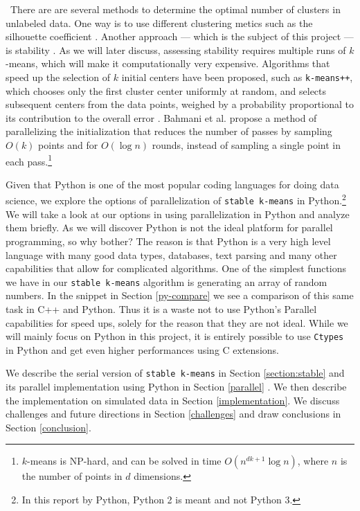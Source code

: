 \documentclass[10pt,twocolumn,letterpaper]{article}
\begin{document}
\
There are are several methods to determine the optimal number of clusters in unlabeled data. One way is to use different clustering metics such as the silhouette coefficient \cite{aranganayagi2007}. Another approach --- which is the subject of this project --- is stability \cite{ben2001}\cite{smith1980}. As we will later discuss, assessing stability requires multiple runs of $k$-means, which will make it computationally very expensive. Algorithms that speed up the selection of $k$ initial centers have been proposed, such as {\texttt{k-means++}}, which chooses only the first cluster center uniformly at random, and selects subsequent centers from the data points, weighed by a probability proportional to its contribution to the overall error \cite{arthur2007}. Bahmani et al. \cite{bahmani2012} propose a method of parallelizing the initialization that reduces the number of passes by sampling $O(k)$ points and for $O (\log n)$ rounds, instead of sampling a single point in each pass.\footnote{$k$-means is NP-hard, and can be solved in time  $O (n^{dk +1} \log n)$, where $n$ is the number of points in $d$ dimensions.}

Given that Python is one of the most popular coding languages for doing data science, we explore the options of parallelization of \texttt{stable k-means} in Python.\footnote{In this report by Python, Python 2 is meant and not Python 3.} We will take a look at our options in using parallelization in Python and analyze them briefly. As we will discover Python is not the ideal platform for parallel programming, so why bother? The reason is that Python is a very high level language with many good data types, databases, text parsing and many other capabilities that allow for complicated algorithms. One of the simplest functions we have in our \texttt{stable k-means} algorithm is generating an array of random numbers. In the snippet in Section \ref{py-compare} we see a comparison of this same task in C++ and Python. Thus it is a waste not to use Python's Parallel capabilities for speed ups, solely for the reason that they are not ideal. While we will mainly focus on Python in this project, it is entirely possible to use \texttt{Ctypes} in Python and get even higher performances using C extensions.

We describe the serial version of \texttt{stable k-means} in Section \ref{section:stable} and its parallel implementation using Python in Section \ref{parallel} . We then describe the implementation on simulated data in Section \ref{implementation}. We discuss challenges and future directions in Section \ref{challenges} and draw conclusions in Section \ref{conclusion}.
\end{document}
